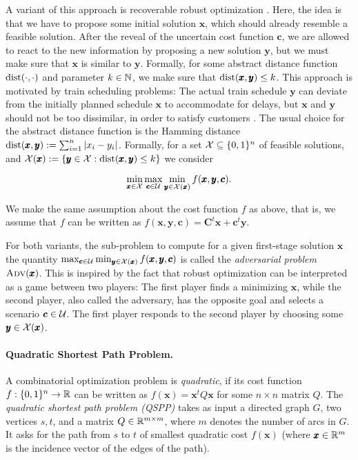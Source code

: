 A variant of this approach is recoverable robust optimization \cite{liebchen2009concept}. Here, the idea is that we have to propose some initial solution $\pmb x$, which should already resemble a feasible solution. 
After the reveal of the uncertain cost function $\pmb c$, we are allowed to react to the new information by proposing a new solution $\pmb y$, but we must make sure that $\pmb x$ is similar to $\pmb y$. Formally, for some abstract distance function $\operatorname{\text{dist}}(\cdot, \cdot)$ and parameter $k \in \mathbb{N}$, we make sure that $\operatorname{\text{dist}}(\pmb x,\pmb y) \leq k$. This approach is motivated by train scheduling problems: The actual train schedule $\pmb y$ can deviate from the initially planned schedule $\pmb x$ to accommodate for delays, but $\pmb x$ and $\pmb y$ should not be too dissimilar, in order to satisfy customers \cite{liebchen2009concept}. The usual choice for the abstract distance function is the Hamming distance $\operatorname{\text{dist}}(\pmb x,\pmb y) := \sum_{i=1}^n |x_i - y_i|$. Formally, for a set $\mathcal{X} \subseteq \{ 0,1 \}^n$ of feasible solutions, and $\mathcal{X}(\pmb x) := \{ \pmb y \in \mathcal{X} : \operatorname{\text{dist}}(\pmb x,\pmb y) \leq k \}$ we consider

\[\min_{\pmb x \in \mathcal{X}} \max_{\pmb c \in \mathcal{U}} \min_{\pmb y \in \mathcal{X}(\pmb x)} f(\pmb x,\pmb y,\pmb c).\]

We make the same assumption about the cost function $f$ as above, that is, we assume that $f$ can be written as  $f(\pmb x,\pmb y,\pmb c) = \pmb C^t\pmb x + \pmb c^t\pmb y$. 

For both variants, the sub-problem to compute for a given first-stage solution $\pmb x$ the quantity $\max_{\pmb c \in \mathcal{U}} \min_{\pmb y \in \mathcal{X}(\pmb x)} f(\pmb x,\pmb y,\pmb c)$ is called the \emph{adversarial problem} $\textsc{Adv}(\pmb x)$. 
This is inspired by the fact that robust optimization can be interpreted as a game between two players: The first player finds a minimizing $\pmb x$, while the second player, also called the adversary, has the opposite goal and selects a scenario $\pmb c \in \mathcal{U}$. The first player responds to the second player by choosing some $\pmb y \in \mathcal{X}(\pmb x)$.

\paragraph*{Quadratic Shortest Path Problem.}
A combinatorial optimization problem is \emph{quadratic}, if its cost function $f : \{ 0,1 \}^n \to \mathbb{R}$ can be written as $f(\pmb x) = \pmb x^tQ\pmb x$ for some $n \times n$ matrix $Q$. The \emph{quadratic shortest path problem (QSPP)} takes as input a directed graph $G$, two vertices $s,t$, and a matrix $Q \in \mathbb{R}^{m \times m}$, where $m$ denotes the number of arcs in $G$. It asks for the path from $s$ to $t$ of smallest quadratic cost $f(\pmb x)$ (where $\pmb x \in \mathbb{R}^m$ is the incidence vector of the edges of the path). 

